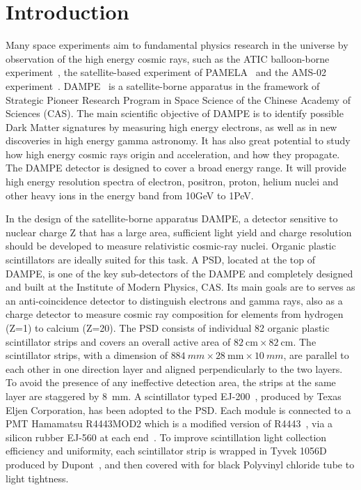 \documentclass[5p, times]{elsarticle}
\begin{document}
\section{Introduction}
\label{sec:introduction}

Many space experiments aim to fundamental physics research in the universe by observation of the high energy cosmic rays, such as the ATIC balloon-borne experiment~\cite{guzik_advanced_1999}, the satellite-based experiment of PAMELA~\cite{picozza2010instrument} and the AMS-02 experiment~\cite{aguilar2013first}.
DAMPE~\cite{Chang_Jin_dampe} is a satellite-borne apparatus in the framework of Strategic Pioneer Research Program in Space Science of the Chinese Academy of Sciences (CAS). 
The main scientific objective of DAMPE is to identify possible Dark Matter signatures by measuring high energy electrons, as well as in new discoveries in high energy gamma astronomy.
It has also great potential to study how high energy cosmic rays origin and acceleration, and how they propagate. 
The DAMPE detector is designed to cover a broad energy range. 
It will provide high energy resolution spectra of electron, positron, proton, helium nuclei and other heavy ions in the energy band from 10GeV to 1PeV.

In the design of the satellite-borne apparatus DAMPE, a detector sensitive to nuclear charge Z that has a large area, sufficient light yield and charge resolution should be developed to measure relativistic cosmic-ray nuclei. 
Organic plastic scintillators are ideally suited for this task. 
A PSD, located at the top of DAMPE, is one of the key sub-detectors of the DAMPE and completely designed and built at the Institute of Modern Physics, CAS. 
Its main goals are to serves as an anti-coincidence detector to distinguish electrons and gamma rays, also as a charge detector to measure cosmic ray composition for elements from hydrogen (Z=1) to calcium (Z=20). 
The PSD consists of individual 82 organic plastic scintillator strips and covers an overall active area of $\SI{82}{\centi\meter} \times \SI{82}{\centi\meter}$. 
The scintillator strips, with a dimension of $\SI{884}{mm} \times \SI{28}{\milli\meter} \times \SI{10}{mm}$, are parallel to each other in one direction layer and aligned perpendicularly to the two layers. 
To avoid the presence of any ineffective detection area, the strips at the same layer are staggered by \SI{8}{mm}. 
A scintillator typed EJ-200~\cite{scintillator}, produced by Texas Eljen Corporation, has been adopted to the PSD. 
Each module is connected to a PMT Hamamatsu R4443MOD2 which is a modified version of R4443~\cite{r4443}, via a silicon rubber EJ-560 at each end~\cite{scintillator}. 
To improve scintillation light collection efficiency and uniformity, each scintillator strip is wrapped in Tyvek 1056D produced by Dupont~\cite{tyvek}, and then covered with for black Polyvinyl chloride tube to light tightness. 
\end{document}
